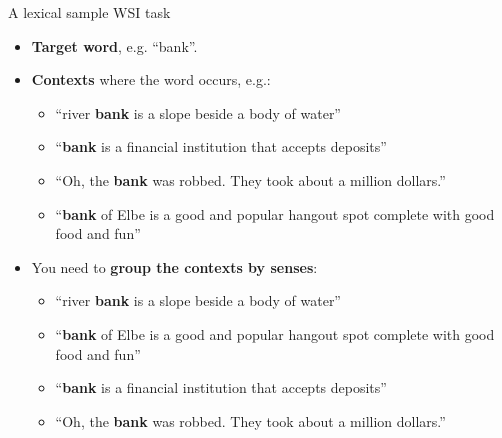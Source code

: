 \begin{frame}{A lexical sample WSI task}
  
  \begin{itemize}
  	\item \textbf{Target word}, e.g. ``bank''.
  	
  	\pause 
  	
  	\item \textbf{Contexts} where the word occurs, e.g.: 
  	\begin{itemize}
  	\item ``river \textbf{bank} is a slope beside a body of water''
  	\item ``\textbf{bank} is a financial institution that accepts deposits''
  	\item ``Oh, the \textbf{bank} was robbed. They took about a million dollars.''
  	\item ``\textbf{bank} of Elbe is a good and popular hangout spot complete with good food and fun''
  	\end{itemize}
  	
  	\pause 
  	
  	\item You need to \textbf{{group} the contexts by senses}:
  	\begin{itemize}
  	\item \textcolor{Cerulean}{``river \textbf{bank} is a slope beside a body of water''}
  	\item \textcolor{Cerulean}{``\textbf{bank} of Elbe is a good and popular hangout spot complete with good food and fun''}
  	\item \alert{``\textbf{bank} is a financial institution that accepts deposits''}
  	\item \alert{``Oh, the \textbf{bank} was robbed. They took about a million dollars.''}
  	\end{itemize}
  	 
  \end{itemize}
  
\end{frame}

